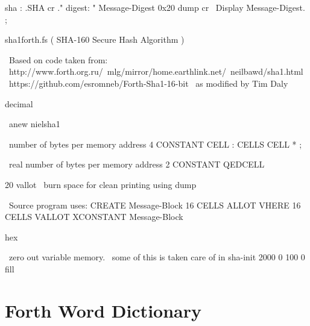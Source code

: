 \begin{chunk}{sha}
: .SHA
cr
." digest: "
   Message-Digest 0x20 dump  cr \  Display Message-Digest.
;

\end{chunk}

\begin{chunk}{sha1forth.fs}
( SHA-160 Secure Hash Algorithm )

\ Based on code taken from:
\ http://www.forth.org.ru/~mlg/mirror/home.earthlink.net/~neilbawd/sha1.html
\ https://github.com/esromneb/Forth-Sha1-16-bit
\ as modified by Tim Daly

decimal 

\ anew nielsha1


\ number of bytes per memory address
4 CONSTANT CELL
: CELLS CELL * ;

\ real number of bytes per memory address
2 CONSTANT QEDCELL

20 vallot \ burn space for clean printing using dump

\ Source program uses: CREATE Message-Block   16 CELLS ALLOT
VHERE 16 CELLS VALLOT
XCONSTANT Message-Block


hex

\ zero out variable memory.
\ some of this is taken care of in sha-init
2000 0 100 0 fill

\end{chunk}

\section{Forth Word Dictionary}

